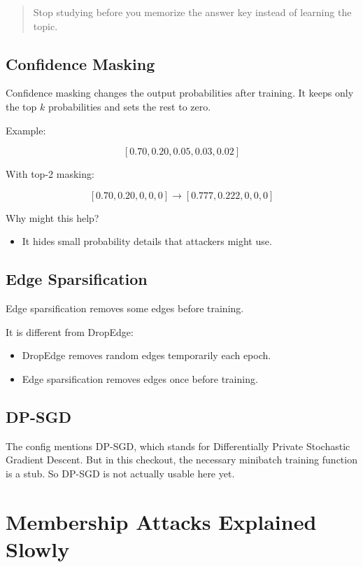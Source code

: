 \documentclass[11pt,a4paper]{article}
\begin{document}
\begin{quote}
Stop studying before you memorize the answer key instead of learning the topic.
\end{quote}

\subsection{Confidence Masking}

Confidence masking changes the output probabilities after training. It keeps only the top \(k\) probabilities and sets the rest to zero.

Example:

\[
[0.70,0.20,0.05,0.03,0.02]
\]

With top-2 masking:

\[
[0.70,0.20,0,0,0] \rightarrow [0.777,0.222,0,0,0]
\]

Why might this help?
\begin{itemize}
  \item It hides small probability details that attackers might use.
\end{itemize}

\subsection{Edge Sparsification}

Edge sparsification removes some edges before training.

It is different from DropEdge:
\begin{itemize}
  \item DropEdge removes random edges temporarily each epoch.
  \item Edge sparsification removes edges once before training.
\end{itemize}

\subsection{DP-SGD}

The config mentions DP-SGD, which stands for Differentially Private Stochastic Gradient Descent. But in this checkout, the necessary minibatch training function is a stub. So DP-SGD is not actually usable here yet.

\section{Membership Attacks Explained Slowly}
\end{document}
